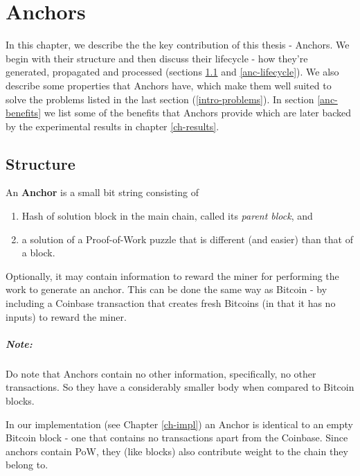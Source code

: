 \chapter{Anchors} \label{ch-anchors}

In this chapter, we describe the the key contribution of this thesis - Anchors. 
We begin with their structure and then discuss their lifecycle - how they're generated, propagated and processed (sections \ref{anc-structure} and \ref{anc-lifecycle}). 
We also describe some properties that Anchors have, which make them well suited to solve the problems listed in the last section (\ref{intro-problems}).
In section \ref{anc-benefits} we list some of the benefits that Anchors provide which are later backed by the experimental results in chapter \ref{ch-results}.


\section{Structure} \label{anc-structure}

An \textbf{Anchor} is a small bit string consisting of 

\begin{enumerate}[i]
    \item Hash of solution block in the main chain, called its \textit{parent block}, and 
    \item a solution of a Proof-of-Work puzzle that is different (and easier) than that of a block.
\end{enumerate}

Optionally, it may contain information to reward the miner for performing the work to generate an anchor.
This can be done the same way as Bitcoin - by including a Coinbase transaction that creates fresh Bitcoins (in that it has no inputs) to reward the miner.

\paragraph{Note: } Do note that Anchors contain no other information, specifically, no other transactions. 
So they have a considerably smaller body when compared to Bitcoin blocks.


In our implementation (see Chapter \ref{ch-impl}) an Anchor is identical to an empty Bitcoin block - one that contains no transactions apart from the Coinbase.
Since anchors contain PoW, they (like blocks) also contribute weight to the chain they belong to.

